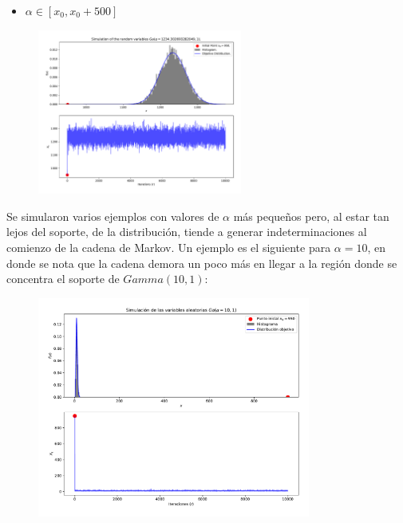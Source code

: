 \begin{itemize}
	\item $\alpha\in[x_0, x_0+500]$
\end{itemize}
\begin{figure}[h!]
	\centering
	\includegraphics[width=0.6\textwidth]{IMAGENES/ex2/example3_ex2.pdf}
\end{figure}

Se simularon varios ejemplos con valores de $\alpha$ más pequeños pero, al estar tan lejos del soporte, de la distribución, tiende a generar indeterminaciones al comienzo de la cadena de Markov. Un ejemplo es el siguiente para $\alpha=10$, en donde se nota que la cadena demora un poco más en llegar a la región donde se concentra el soporte de $Gamma(10,1)$:
\begin{figure}[h!]
	\centering
	\includegraphics[width=0.8\textwidth]{IMAGENES/ejer2_alphamalo.pdf}
\end{figure}